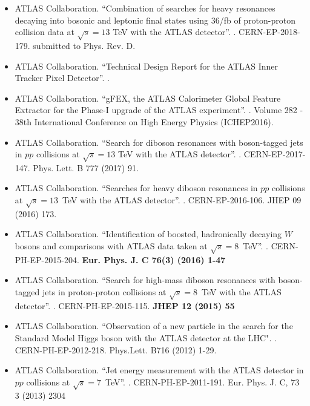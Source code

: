 \documentclass[letterpaper,10pt]{article}
\begin{document}
	\begin{itemize}
	       \item ATLAS Collaboration. ``Combination of searches for heavy resonances decaying into bosonic and leptonic final states using 36/fb of proton-proton collision data at $\sqrt{s}=13$ TeV with the ATLAS detector''. \href{https://arxiv.org/abs/1808.02380}{\color{blue}{hep-ex/1808.02380}}. CERN-EP-2018-179. submitted to Phys. Rev. D.
	       
	       \item ATLAS Collaboration. ``Technical Design Report for the ATLAS Inner Tracker Pixel Detector''. \href{https://cds.cern.ch/record/2285585}{\color{blue}{CERN-LHCC-2017-021}}. 
	        
	        \item ATLAS Collaboration. ``gFEX, the ATLAS Calorimeter Global Feature Extractor for the Phase-I upgrade of the ATLAS experiment''. \href{https://pos.sissa.it/282/1055}{\color{blue}{DOI:10.22323/1.282.1055}}. Volume 282 - 38th International Conference on High Energy Physics (ICHEP2016).
	        
		\item ATLAS Collaboration. ``Search for diboson resonances with boson-tagged jets in
                        $pp$ collisions at $\sqrt{s}=13$ TeV with the ATLAS
                        detector''. \href{https://arxiv.org/abs/1708.04445}{\color{blue}{hep-ex/1708.04445}}. CERN-EP-2017-147. Phys. Lett. B 777 (2017) 91.
	
	        \item ATLAS Collaboration. ``Searches for heavy diboson resonances in $pp$ collisions at $\sqrt{s}=13 $~TeV with the ATLAS detector''. \href{http://arxiv.org/abs/1606.04833}{\color{blue}{hep-ex/1606.04833 }}. CERN-EP-2016-106. JHEP 09 (2016) 173.
		\item ATLAS Collaboration. ``Identification of boosted, hadronically decaying $W$ bosons and comparisons with ATLAS data taken at $\sqrt{s}=8 $~TeV''. \href{http://arxiv.org/abs/1510.05821}{\color{blue}{hep-ex/1510.05821}}. CERN-PH-EP-2015-204. 
{\bf Eur. Phys. J. C 76(3) (2016) 1-47} 
                \item ATLAS Collaboration. ``Search for high-mass diboson resonances with boson-tagged jets in proton-proton collisions at $\sqrt{s}= 8$~TeV with the ATLAS detector''. \href{http://arxiv.org/abs/1506.00962}{\color{blue}{hep-ex/1506.00962}}. CERN-PH-EP-2015-115. 
{\bf JHEP 12 (2015) 55}
	      	\item ATLAS Collaboration. ``Observation of a new particle in the search for the Standard Model Higgs boson with the ATLAS detector at the LHC". 
  \href{https://arxiv.org/abs/1207.7214}{\color{blue}{hep-ex/1207.7214}}. CERN-PH-EP-2012-218. Phys.Lett. B716 (2012) 1-29.
  
		\item ATLAS Collaboration. ``Jet energy measurement with the ATLAS detector in $pp$ collisions 
at $\sqrt{s} = 7$~TeV''. \href{http://arxiv.org/abs/1112.6426}{\color{blue}{hep-ex/1112.6426}}. CERN-PH-EP-2011-191. 
{Eur. Phys. J. C, 73 3 (2013) 2304}

	\end{itemize} %
	
\end{document}
